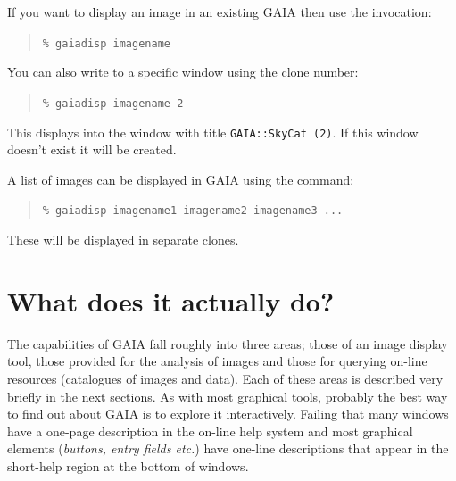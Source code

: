\documentclass[twoside,11pt]{article}
\newcommand{\xlabel}[1]{}
\renewcommand{\_}{\texttt{\symbol{95}}}
\newcommand{\mytt}[1]{{\texttt{#1}}}
\begin{document}
If you want to display an image in an existing GAIA then use the
invocation:
\begin{quote}
\mytt{\% gaiadisp image\_name}
\end{quote}
You can also write to a specific window using the clone number:
\begin{quote}
\mytt{\% gaiadisp image\_name 2}
\end{quote}
This displays into the window with title \mytt{GAIA::SkyCat (2)}. If
this window doesn't exist it will be created.

A list of images can be displayed in GAIA using the command:
\begin{quote}
\mytt{\% gaiadisp image\_name1 image\_name2 image\_name3 ...}
\end{quote}
These will be displayed in separate clones.



\section{\xlabel{what_does_it_actually_do}What does it actually do?}

The capabilities of GAIA fall roughly into three areas; those of an
image display tool, those provided for the analysis of images and
those for querying on-line resources (catalogues of images and
data). Each of these areas is described very briefly in the next
sections. As with most graphical tools, probably the best way to find
out about GAIA is to explore it interactively. Failing that many
windows have a one-page description in the on-line help system and
most graphical elements (\textit{buttons, entry fields etc.}) have
one-line descriptions that appear in the short-help region at the
bottom of windows.
\end{document}
